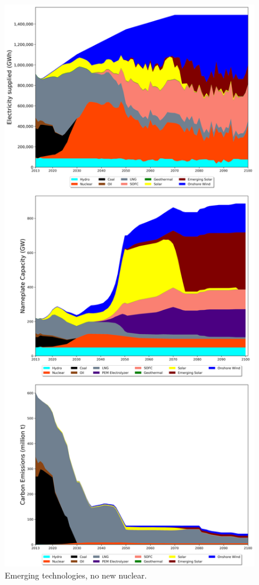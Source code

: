 \begin{figure}[h] 
\centering
\vspace*{-3cm}
\includegraphics[scale=0.41]{figures/newtechs_nuc}
\caption{Emerging technologies, no new nuclear.}
\label{scen4}
\end{figure}


